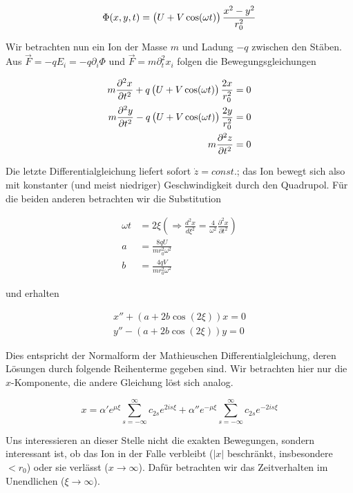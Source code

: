 \documentclass[a4paper,german,12pt,smallheadings]{scrartcl}
\begin{document}
\begin{equation}
  \Phi(x,y,t) = \del{U + V \cos(\omega t)} \frac{x^2-y^2}{r_0^2}
\end{equation}

Wir betrachten nun ein Ion der Masse $m$ und Ladung $-q$ zwischen den Stäben.
Aus $\vec{F} = -q E_i = -q \partial_i \Phi$ und $\vec{F} = m \partial_t^2 x_i$
folgen die Bewegungsgleichungen

\begin{align}
  m \frac{\partial^2 x}{\partial t^2} + q \del{U + V \cos(\omega t)} \frac{2 x}{r_0^2} &= 0 \\
  m \frac{\partial^2 y}{\partial t^2} - q \del{U + V \cos(\omega t)} \frac{2 y}{r_0^2} &= 0 \\
  m \frac{\partial^2 z}{\partial t^2} &= 0
\end{align}

Die letzte Differentialgleichung liefert sofort $\dot z=const.$; das Ion bewegt sich also mit konstanter (und meist niedriger) Geschwindigkeit durch den Quadrupol. Für die beiden anderen
betrachten wir die Substitution

\begin{align}
  \omega t &= 2 \xi \left(\Rightarrow \frac{d^2 x}{d \xi^2}=\frac{4}{\omega^2}\frac{\partial^2 x}{\partial t^2} \right) \\
  a &= \frac{8qU}{m r_0^2 \omega^2} \\
  b &= \frac{4qV}{m r_0^2 \omega^2}
\end{align}

und erhalten

\begin{align}
  x'' + (a + 2 b \cos(2 \xi)) x = 0 \\
  y'' - (a + 2 b \cos(2 \xi)) y = 0 
\end{align}

Dies entspricht der Normalform der Mathieuschen Differentialgleichung, deren
Lösungen durch folgende Reihenterme gegeben sind. Wir betrachten hier nur die
$x$-Komponente, die andere Gleichung löst sich analog.

\begin{equation}
  x = \alpha' e^{\mu \xi} \sum_{s=-\infty}^{\infty} c_{2s} e^{2is \xi} + \alpha'' e^{-\mu \xi} \sum_{s=-\infty}^{\infty} c_{2s} e^{-2is \xi}
\end{equation}

Uns interessieren an dieser Stelle nicht die exakten Bewegungen, sondern
interessant ist, ob das Ion in der Falle verbleibt ($|x|$ beschränkt, insbesondere $<r_0$) oder sie
verlässt ($x \to \infty$). Dafür betrachten wir das Zeitverhalten im
Unendlichen ($\xi \to \infty$).
\end{document}

